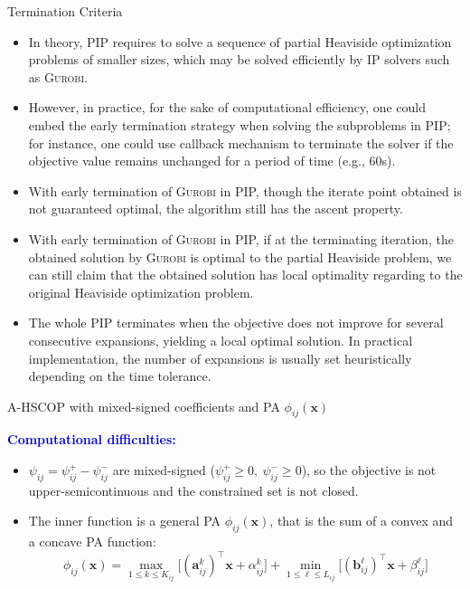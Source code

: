 \documentclass[aspectratio=169,xcolor=dvipsnames]{beamer}
\begin{document}
\begin{frame}{Termination Criteria}
  \small
  \begin{itemize}
    \setlength{\itemsep}{0.11cm}
    \item In theory, PIP requires to solve a sequence of partial Heaviside
      optimization problems of smaller sizes, which may be solved efficiently by
      IP solvers such as \textsc{Gurobi}.
    \item However, in practice, for the sake of computational efficiency, one
      could embed the early termination strategy when solving the subproblems in
      PIP; for instance, one could use callback mechanism to terminate the
      solver if the objective value remains unchanged for a period of time
      (e.g., 60s).
    \item With early termination of \textsc{Gurobi} in PIP, though the iterate
      point obtained is not guaranteed optimal, the algorithm still has the
      ascent property.
    \item With early termination of \textsc{Gurobi} in PIP, if at the
      terminating iteration, the obtained solution by \textsc{Gurobi} is optimal
      to the partial Heaviside problem, we can still claim that the obtained
      solution has local optimality regarding to the original Heaviside
      optimization problem.
    \item The whole PIP terminates when the objective does not improve for
      several consecutive expansions, yielding a local optimal solution. In
      practical implementation, the number of expansions is usually set
      heuristically depending on the time tolerance.
  \end{itemize}
\end{frame}

\begin{frame}{A-HSCOP with mixed-signed coefficients and PA $\phi_{ij}(\mathbf{x})$}
  \small
  \setlength{\abovedisplayskip}{5pt}
  \setlength{\belowdisplayskip}{5pt}

  \textcolor{MediumBlue}{\textbf{Computational difficulties:}}
  \begin{itemize}
    \setlength{\itemsep}{0.16cm}
    \item $\psi_{ij}=\psi^+_{ij}-\psi^-_{ij}$ are mixed-signed
      ($\psi^+_{ij}\geq 0,\ \psi^-_{ij}\geq 0$), so the objective is not
      upper-semicontinuous and the constrained set is not closed.
    \item The inner function is a general PA $\phi_{ij}(\mathbf{x})$, that is the
      sum of a convex and a concave PA function:
      \[
        \phi_{ij}(\mathbf{x})=\max_{1\leq k\leq K_{ij}}
          \bigl[(\mathbf{a}^k_{ij})^\top\mathbf{x}+\alpha^k_{ij}\bigr]
        +\min_{1\leq\ell\leq L_{ij}}
          \bigl[(\mathbf{b}^\ell_{ij})^\top\mathbf{x}+\beta^\ell_{ij}\bigr]
      \]
  \end{itemize}
\end{frame}
\end{document}
